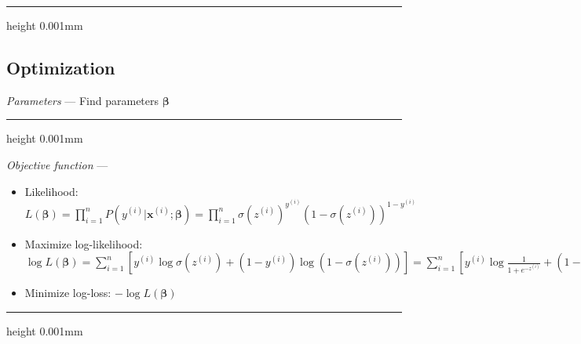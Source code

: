 {\color{black}\hrule height 0.001mm}

\subsection*{Optimization}
\emph{Parameters} --- Find parameters $\boldsymbol{\beta}$

{\color{lightgray}\hrule height 0.001mm}

\emph{Objective function} --- 
\begin{itemize}
    \item Likelihood: $L(\boldsymbol{\beta}) = \prod_{i=1}^n P(y^{(i)} | \boldsymbol{x}^{(i)}; \boldsymbol{\beta}) = \prod_{i=1}^n \sigma(z^{(i)})^{y^{(i)}} (1 - \sigma(z^{(i)}))^{1 - y^{(i)}}$
    \item Maximize log-likelihood: 
    $\log L(\boldsymbol{\beta}) = \sum_{i=1}^n \left[ y^{(i)} \log \sigma(z^{(i)}) + (1 - y^{(i)}) \log (1 - \sigma(z^{(i)})) \right] = \sum_{i=1}^n \left[ y^{(i)} \log \frac{1}{1 + e^{-z^{(i)}}} + (1 - y^{(i)}) \log \frac{e^{-z^{(i)}}}{1 + e^{-z^{(i)}}} \right] = \sum_{i=1}^n \left[ y^{(i)} z^{(i)} - \log (1 + e^{z^{(i)}}) \right]$
    \item Minimize log-loss: $ -\log L(\boldsymbol{\beta})$
\end{itemize}

{\color{lightgray}\hrule height 0.001mm}

